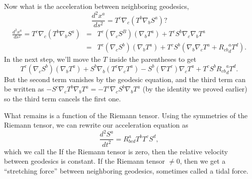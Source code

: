 Now what is the acceleration between neighboring geodesics,
$$\frac{d^2x^a}{ds^2}=T^c \nabla_c(T^b \nabla_b S^a)?$$
\begin{eqnarray*}
\frac{d^2x^a}{ds^2}=T^c \nabla_c(T^b \nabla_b S^a)&=&T^c (\nabla_c S^B)(\nabla_b T^a)+T^c S^b \nabla_c \nabla_b T^a\\
&=& T^c(\nabla_c S^b)(\nabla_b T^a)+T^c S^b(\nabla_b \nabla_c T^a +{R_{cb}}^a_d T^d).
\end{eqnarray*}
In the next step, we'll move the $T$ inside the parentheses to get
$$T^c(\nabla_c S^b)(\nabla_b T^a)+S^b\nabla_b(T^c \nabla_c T^a) - S^b(\nabla T^c) \nabla_c T^a+T^c S^b{R_{cb}}^a_d T^d.$$
But the second term vanishes by the geodesic equation, and the third term can be written as
$-S^c \nabla_c T^b \nabla_b T^a = -T^c \nabla_c S^b \nabla_b T^a$ (by the identity we proved earlier) so the third term cancels the first one.

What remains is a function of the Riemann tensor. Using the symmetries of the Riemann tensor, we can rewrite our acceleration equation as
$$\frac{d^2S^a}{dt^2}=R^a_{bcd} T^b T^c S^d,$$
which we call the  If the Riemann tensor is zero, then the relative velocity between geodesics is constant. If the Riemann tensor $\neq 0$, then we get a ``stretching force'' between neighboring geodesics, sometimes called a tidal force.